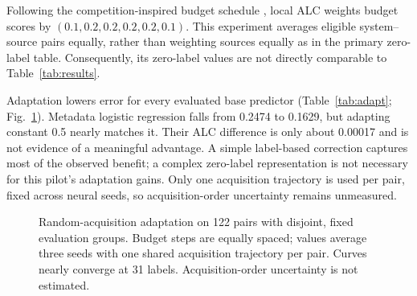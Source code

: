 \documentclass[conference]{IEEEtran}
\begin{document}
Following the competition-inspired budget schedule \cite{aims}, local ALC weights budget scores by $(0.1,0.2,0.2,0.2,0.2,0.1)$. This experiment averages eligible system--source pairs equally, rather than weighting sources equally as in the primary zero-label table. Consequently, its zero-label values are not directly comparable to Table~\ref{tab:results}.

Adaptation lowers error for every evaluated base predictor (Table~\ref{tab:adapt}; Fig.~\ref{fig:adaptation}). Metadata logistic regression falls from 0.2474 to 0.1629, but adapting constant 0.5 nearly matches it. Their ALC difference is only about 0.00017 and is not evidence of a meaningful advantage. A simple label-based correction captures most of the observed benefit; a complex zero-label representation is not necessary for this pilot's adaptation gains. Only one acquisition trajectory is used per pair, fixed across neural seeds, so acquisition-order uncertainty remains unmeasured.

\begin{figure}[t]
\centering
{}
\caption{Random-acquisition adaptation on 122 pairs with disjoint, fixed evaluation groups. Budget steps are equally spaced; values average three seeds with one shared acquisition trajectory per pair. Curves nearly converge at 31 labels. Acquisition-order uncertainty is not estimated.}
\label{fig:adaptation}
\end{figure}
\end{document}
